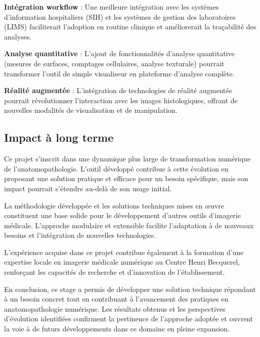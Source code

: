 \documentclass[12pt,a4paper]{report}
\begin{document}
\textbf{Intégration workflow} : Une meilleure intégration avec les systèmes d'information hospitaliers (SIH) et les systèmes de gestion des laboratoires (LIMS) faciliterait l'adoption en routine clinique et améliorerait la traçabilité des analyses.

\textbf{Analyse quantitative} : L'ajout de fonctionnalités d'analyse quantitative (mesures de surfaces, comptages cellulaires, analyse texturale) pourrait transformer l'outil de simple visualiseur en plateforme d'analyse complète.

\textbf{Réalité augmentée} : L'intégration de technologies de réalité augmentée pourrait révolutionner l'interaction avec les images histologiques, offrant de nouvelles modalités de visualisation et de manipulation.

\subsection{Impact à long terme}

Ce projet s'inscrit dans une dynamique plus large de transformation numérique de l'anatomopathologie. L'outil développé contribue à cette évolution en proposant une solution pratique et efficace pour un besoin spécifique, mais son impact pourrait s'étendre au-delà de son usage initial.

La méthodologie développée et les solutions techniques mises en œuvre constituent une base solide pour le développement d'autres outils d'imagerie médicale. L'approche modulaire et extensible facilite l'adaptation à de nouveaux besoins et l'intégration de nouvelles technologies.

L'expérience acquise dans ce projet contribue également à la formation d'une expertise locale en imagerie médicale numérique au Centre Henri Becquerel, renforçant les capacités de recherche et d'innovation de l'établissement.

En conclusion, ce stage a permis de développer une solution technique répondant à un besoin concret tout en contribuant à l'avancement des pratiques en anatomopathologie numérique. Les résultats obtenus et les perspectives d'évolution identifiées confirment la pertinence de l'approche adoptée et ouvrent la voie à de futurs développements dans ce domaine en pleine expansion.
\end{document}
